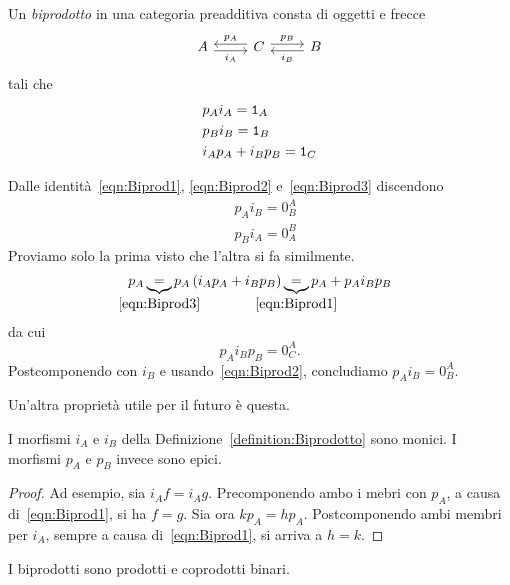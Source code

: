 \begin{definition}\label{definition:Biprodotto}
  Un {\em biprodotto} in una categoria preadditiva consta di oggetti e
  frecce
  \[
    \begin{tikzcd}
      A \ar["{i_A}", r, shift right, swap] & C \ar["{p_A}", l, shift
      right, swap] \ar["{p_B}", r, shift left] & B \ar["{i_B}", l, shift
      left]
    \end{tikzcd}
  \]
  tali che
  \begin{align}
    & p_A i_A = \mathtt 1_A \label{eqn:Biprod1} \\
    & p_B i_B = \mathtt 1_B \label{eqn:Biprod2}\\
    & i_A p_A + i_B p_B = \mathtt 1_C \label{eqn:Biprod3}
  \end{align}
\end{definition}

\begin{remark}
  Dalle identità~\ref{eqn:Biprod1}, \ref{eqn:Biprod2}
  e~\ref{eqn:Biprod3} discendono
  \begin{align}
    & p_A i_B = 0_B^A \label{eqn:Biprod4} \\
    & p_B i_A = 0_A^B \label{eqn:Biprod5}
  \end{align}
  Proviamo solo la prima visto che l'altra si fa similmente.
  \[
    p_A \underbrace{=}_{\mathclap{\eqref{eqn:Biprod3}}} p_A \left( i_A
      p_A + i_B p_B \right)
    \underbrace{=}_{\mathclap{\eqref{eqn:Biprod1}}} p_A + p_A i_B p_B
  \]
  da cui
  \[
    p_A i_B p_B = 0_C^A .
  \]
  Postcomponendo con \(i_B\) e usando~\eqref{eqn:Biprod2}, concludiamo
  \(p_A i_B = 0_B^A\).
\end{remark}

Un'altra proprietà utile per il futuro è questa.

\begin{proposition}
  I morfismi \(i_A\) e \(i_B\) della
  Definizione~\ref{definition:Biprodotto} sono monici. I morfismi
  \(p_A\) e \(p_B\) invece sono epici.
\end{proposition}

\begin{proof}
  Ad esempio, sia \(i_A f = i_A g\). Precomponendo ambo i mebri con
  \(p_A\), a causa di~\eqref{eqn:Biprod1}, si ha \(f = g\). Sia ora
  \(k p_A = h p_A\). Postcomponendo ambi membri per \(i_A\), sempre a
  causa di~\eqref{eqn:Biprod1}, si arriva a \(h = k\).
\end{proof}

I biprodotti sono prodotti e coprodotti binari.

